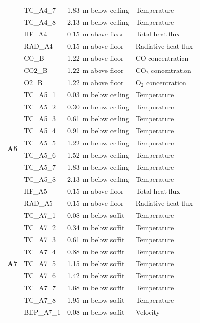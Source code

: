 \documentclass[12pt,oneside]{book}
\begin{document}
\begin{longtable}[c]{c|lll}
 & TC\_A4\_7  & 1.83~m below ceiling & Temperature \\
 & TC\_A4\_8  & 2.13~m below ceiling & Temperature \\
\cline{2-4}
 & HF\_A4	  & 0.15~m above floor   & Total heat flux \\
 & RAD\_A4    & 0.15~m above floor   & Radiative heat flux \\
\cline{2-4}
 & CO\_B      & 1.22~m above floor   & CO concentration \\
 & CO2\_B     & 1.22~m above floor   & CO$_2$ concentration \\
 & O2\_B      & 1.22~m above floor   & O$_2$ concentration \\
\midrule
\multirow{10}{*}{\large{\textbf{A5}}}
 & TC\_A5\_1  & 0.03~m below ceiling & Temperature \\
 & TC\_A5\_2  & 0.30~m below ceiling & Temperature \\
 & TC\_A5\_3  & 0.61~m below ceiling & Temperature \\
 & TC\_A5\_4  & 0.91~m below ceiling & Temperature \\
 & TC\_A5\_5  & 1.22~m below ceiling & Temperature \\
 & TC\_A5\_6  & 1.52~m below ceiling & Temperature \\
 & TC\_A5\_7  & 1.83~m below ceiling & Temperature \\
 & TC\_A5\_8  & 2.13~m below ceiling & Temperature \\
\cline{2-4}
 & HF\_A5	  & 0.15~m above floor   & Total heat flux \\
 & RAD\_A5    & 0.15~m above floor   & Radiative heat flux \\
\midrule
\multirow{16}{*}{\large{\textbf{A7}}}
 & TC\_A7\_1  & 0.08~m below soffit  & Temperature \\
 & TC\_A7\_2  & 0.34~m below soffit  & Temperature \\
 & TC\_A7\_3  & 0.61~m below soffit  & Temperature \\
 & TC\_A7\_4  & 0.88~m below soffit  & Temperature \\
 & TC\_A7\_5  & 1.15~m below soffit  & Temperature \\
 & TC\_A7\_6  & 1.42~m below soffit  & Temperature \\
 & TC\_A7\_7  & 1.68~m below soffit  & Temperature \\
 & TC\_A7\_8  & 1.95~m below soffit  & Temperature \\
\cline{2-4}
 & BDP\_A7\_1 & 0.08~m below soffit  & Velocity \\

\end{longtable}
\end{document}

